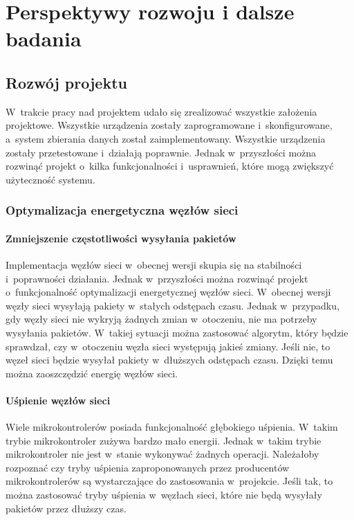 \chapter{Perspektywy rozwoju i dalsze badania}

\section{Rozwój projektu}
W~trakcie pracy nad projektem udało się zrealizować wszystkie założenia projektowe.
Wszystkie urządzenia zostały zaprogramowane i~skonfigurowane, a~system zbierania danych został zaimplementowany.
Wszystkie urządzenia zostały przetestowane i~działają poprawnie.
Jednak w~przyszłości można rozwinąć projekt o~kilka funkcjonalności i~usprawnień, które mogą zwiększyć użyteczność systemu.

\subsection{Optymalizacja energetyczna węzłów sieci}
\subsubsection*{Zmniejszenie częstotliwości wysyłania pakietów}
Implementacja węzłów sieci w~obecnej wersji skupia się na stabilności i~poprawności działania.
Jednak w~przyszłości można rozwinąć projekt o~funkcjonalność optymalizacji energetycznej węzłów sieci.
W~obecnej wersji węzły sieci wysyłają pakiety w~stałych odstępach czasu.
Jednak w~przypadku, gdy węzły sieci nie wykryją żadnych zmian w~otoczeniu, nie ma potrzeby wysyłania pakietów.
W~takiej sytuacji można zastosować algorytm, który będzie sprawdzał, czy w~otoczeniu węzła sieci występują jakieś zmiany.
Jeśli nie, to węzeł sieci będzie wysyłał pakiety w~dłuższych odstępach czasu.
Dzięki temu można zaoszczędzić energię węzłów sieci.

\subsubsection{Uśpienie węzłów sieci}

Wiele mikrokontrolerów posiada funkcjonalność głębokiego uśpienia.
W~takim trybie mikrokontroler zużywa bardzo mało energii.
Jednak w~takim trybie mikrokontroler nie jest w~stanie wykonywać żadnych operacji.
Należałoby rozpoznać czy tryby uśpienia zaproponowanych przez producentów mikrokontrolerów są wystarczające do zastosowania w~projekcie.
Jeśli tak, to można zastosować tryby uśpienia w~węzłach sieci, które nie będą wysyłały pakietów przez dłuższy czas.

